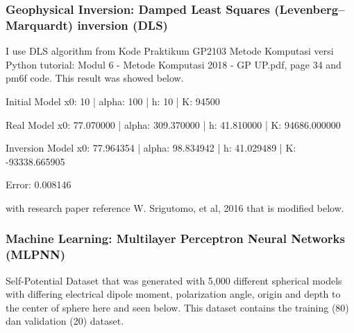 \documentclass[12pt,oneside,a4paper]{article}
\begin{document}
\subsubsection{Geophysical Inversion: Damped Least Squares (Levenberg–Marquardt) inversion (DLS)}
I use DLS algorithm from Kode Praktikum GP2103 Metode Komputasi versi Python tutorial: Modul 6 - Metode Komputasi 2018 - GP UP.pdf, page 34 and pm6f code. This result was showed below.

Initial Model x0: 10 | alpha: 100 | h: 10 | K: 94500

Real Model x0: 77.070000 | alpha: 309.370000 | h: 41.810000 | K: 94686.000000

Inversion Model x0: 77.964354 | alpha: 98.834942 | h: 41.029489 | K: -93338.665905

Error: 0.008146

with research paper reference W. Srigutomo, et al, 2016 that is modified below.

\subsubsection{Machine Learning: Multilayer Perceptron Neural Networks (MLPNN)}

Self-Potential Dataset that was generated with 5,000 different spherical models with differing electrical dipole moment, polarization angle, origin and depth to the center of sphere here and seen below. This dataset contains the training (80) dan validation (20) dataset.
\end{document}
